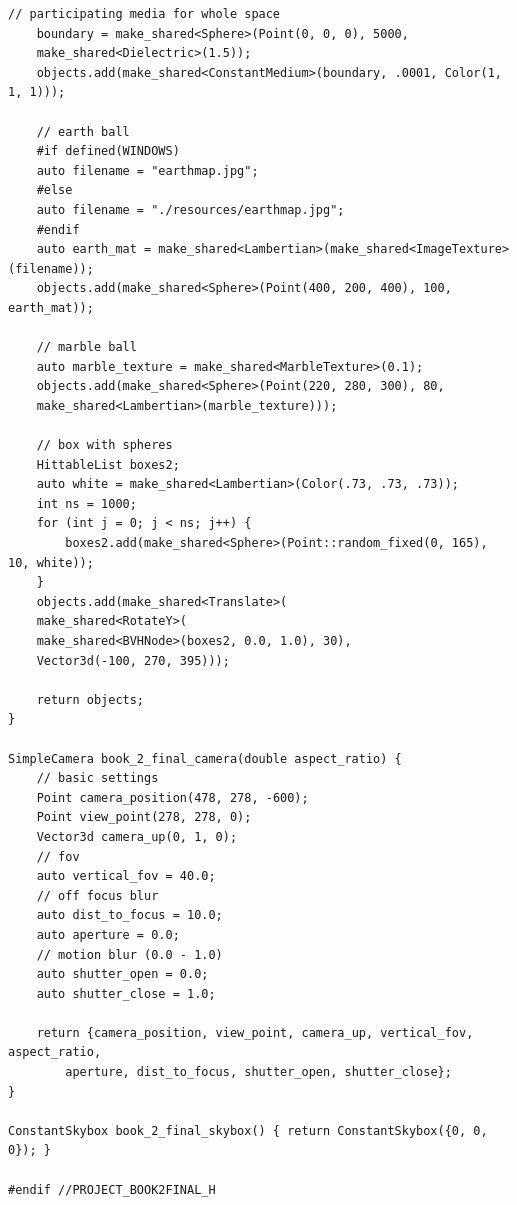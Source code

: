 \documentclass[utf8]{article}
\begin{document}
\begin{lstlisting}[style=CStyle]
	// participating media for whole space
	boundary = make_shared<Sphere>(Point(0, 0, 0), 5000,
	make_shared<Dielectric>(1.5));
	objects.add(make_shared<ConstantMedium>(boundary, .0001, Color(1, 1, 1)));
	
	// earth ball
	#if defined(WINDOWS)
	auto filename = "earthmap.jpg";
	#else
	auto filename = "./resources/earthmap.jpg";
	#endif
	auto earth_mat = make_shared<Lambertian>(make_shared<ImageTexture>(filename));
	objects.add(make_shared<Sphere>(Point(400, 200, 400), 100, earth_mat));
	
	// marble ball
	auto marble_texture = make_shared<MarbleTexture>(0.1);
	objects.add(make_shared<Sphere>(Point(220, 280, 300), 80,
	make_shared<Lambertian>(marble_texture)));
	
	// box with spheres
	HittableList boxes2;
	auto white = make_shared<Lambertian>(Color(.73, .73, .73));
	int ns = 1000;
	for (int j = 0; j < ns; j++) {
		boxes2.add(make_shared<Sphere>(Point::random_fixed(0, 165), 10, white));
	}
	objects.add(make_shared<Translate>(
	make_shared<RotateY>(
	make_shared<BVHNode>(boxes2, 0.0, 1.0), 30),
	Vector3d(-100, 270, 395)));
	
	return objects;
}

SimpleCamera book_2_final_camera(double aspect_ratio) {
	// basic settings
	Point camera_position(478, 278, -600);
	Point view_point(278, 278, 0);
	Vector3d camera_up(0, 1, 0);
	// fov
	auto vertical_fov = 40.0;
	// off focus blur
	auto dist_to_focus = 10.0;
	auto aperture = 0.0;
	// motion blur (0.0 - 1.0)
	auto shutter_open = 0.0;
	auto shutter_close = 1.0;
	
	return {camera_position, view_point, camera_up, vertical_fov, aspect_ratio,
		aperture, dist_to_focus, shutter_open, shutter_close};
}

ConstantSkybox book_2_final_skybox() { return ConstantSkybox({0, 0, 0}); }

#endif //PROJECT_BOOK2FINAL_H

\end{lstlisting}
\end{document}
